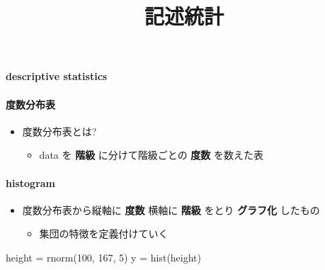 \documentclass[
]{article}
\title{記述統計}
\author{}
\date{\vspace{-2.5em}}
\newenvironment{Shaded}{\begin{snugshade}}{\end{snugshade}}
\newcommand{\DecValTok}[1]{\textcolor[rgb]{0.00,0.00,0.81}{#1}}
\newcommand{\FunctionTok}[1]{\textcolor[rgb]{0.00,0.00,0.00}{#1}}
\newcommand{\NormalTok}[1]{#1}
\newcommand{\OtherTok}[1]{\textcolor[rgb]{0.56,0.35,0.01}{#1}}
\providecommand{\tightlist}{%
  \setlength{\itemsep}{0pt}\setlength{\parskip}{0pt}}
\begin{document}
\maketitle

\hypertarget{descriptive-statistics}{%
\paragraph{descriptive statistics}\label{descriptive-statistics}}

\hypertarget{ux5ea6ux6570ux5206ux5e03ux8868}{%
\paragraph{度数分布表}\label{ux5ea6ux6570ux5206ux5e03ux8868}}

\begin{itemize}
\item
  度数分布表とは?

  \begin{itemize}
  \tightlist
  \item
    data を \textbf{階級} に分けて階級ごとの \textbf{度数} を数えた表
  \end{itemize}
\end{itemize}

\hypertarget{histogram}{%
\paragraph{histogram}\label{histogram}}

\begin{itemize}
\item
  度数分布表から縦軸に \textbf{度数} 横軸に \textbf{階級} をとり
  \textbf{グラフ化} したもの

  \begin{itemize}
  \tightlist
  \item
    集団の特徴を定義付けていく
  \end{itemize}
\end{itemize}

\begin{Shaded}
\begin{Highlighting}[]
\NormalTok{height }\OtherTok{=}
  \FunctionTok{rnorm}\NormalTok{(}\DecValTok{100}\NormalTok{, }\DecValTok{167}\NormalTok{, }\DecValTok{5}\NormalTok{)}
\NormalTok{y }\OtherTok{=} \FunctionTok{hist}\NormalTok{(height)}
\end{Highlighting}
\end{Shaded}
\end{document}
